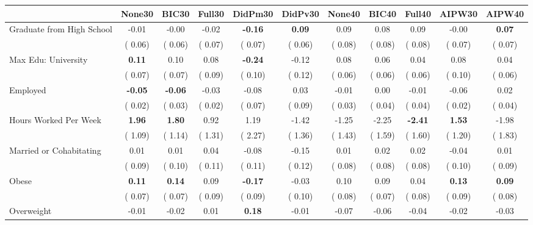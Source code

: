 \begin{tabular}{l c c c c c c c c c c}
\toprule
 & None30 & BIC30 & Full30 & DidPm30 & DidPv30 & None40 & BIC40 & Full40 & AIPW30 & AIPW40 \\
\midrule
Graduate from High School &     -0.01 &     -0.00 &     -0.02 & \textbf{     -0.16 } & \textbf{      0.09 } &      0.09 &      0.08 &      0.09 &     -0.00 & \textbf{     0.07} \\
& (     0.06) & (     0.06) & (     0.07) & (     0.07) & (     0.06) & (     0.08) & (     0.08) & (     0.08) & (     0.07) & (     0.07) \\
Max Edu: University & \textbf{      0.11 } &      0.10 &      0.08 & \textbf{     -0.24 } &     -0.12 &      0.08 &      0.06 &      0.04 &      0.08 &      0.04 \\
& (     0.07) & (     0.07) & (     0.09) & (     0.10) & (     0.12) & (     0.06) & (     0.06) & (     0.06) & (     0.10) & (     0.06) \\
Employed & \textbf{     -0.05 } & \textbf{     -0.06 } &     -0.03 &     -0.08 &      0.03 &     -0.01 &      0.00 &     -0.01 &     -0.06 &      0.02 \\
& (     0.02) & (     0.03) & (     0.02) & (     0.07) & (     0.09) & (     0.03) & (     0.04) & (     0.04) & (     0.02) & (     0.04) \\
Hours Worked Per Week & \textbf{      1.96 } & \textbf{      1.80 } &      0.92 &      1.19 &     -1.42 &     -1.25 &     -2.25 & \textbf{     -2.41 } & \textbf{     1.53} &     -1.98 \\
& (     1.09) & (     1.14) & (     1.31) & (     2.27) & (     1.36) & (     1.43) & (     1.59) & (     1.60) & (     1.20) & (     1.83) \\
Married or Cohabitating &      0.01 &      0.01 &      0.04 &     -0.08 &     -0.15 &      0.01 &      0.02 &      0.02 &     -0.04 &      0.01 \\
& (     0.09) & (     0.10) & (     0.11) & (     0.11) & (     0.12) & (     0.08) & (     0.08) & (     0.08) & (     0.10) & (     0.09) \\
Obese & \textbf{      0.11 } & \textbf{      0.14 } &      0.09 & \textbf{     -0.17 } &     -0.03 &      0.10 &      0.09 &      0.04 & \textbf{     0.13} & \textbf{     0.09} \\
& (     0.07) & (     0.07) & (     0.09) & (     0.09) & (     0.10) & (     0.08) & (     0.07) & (     0.08) & (     0.09) & (     0.08) \\
Overweight &     -0.01 &     -0.02 &      0.01 & \textbf{      0.18 } &     -0.01 &     -0.07 &     -0.06 &     -0.04 &     -0.02 &     -0.03 \\

\end{tabular}
